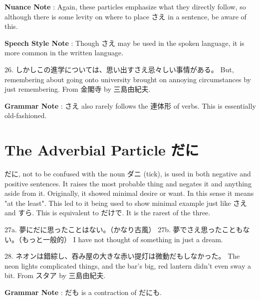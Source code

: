 \par{\textbf{Nuance Note }: Again, these particles emphasize what they directly follow, so although there is some levity on where to place さえ in a sentence, be aware of this. }

\par{\textbf{Speech Style Note }: Though さえ may be used in the spoken language, it is more common in the written language. }

\par{26. しかしこの進学については、思い出すさえ忌々しい事情がある。 \hfill\break
But, remembering about going onto university brought on annoying circumstances by just remembering. \hfill\break
From 金閣寺 by 三島由紀夫. }

\par{\textbf{Grammar Note }: さえ also rarely follows the 連体形 of verbs. This is essentially old-fashioned. }
      
\section{The Adverbial Particle だに}
 
\par{ だに, not to be confused with the noun ダニ (tick), is used in both negative and positive sentences. It raises the most probable thing and negates it and anything aside from it. Originally, it showed minimal desire or want. In this sense it means "at the least". This led to it being used to show minimal example just like さえ and すら. This is equivalent to だけで. It is the rarest of the three. }

\par{27a. 夢にだに思ったことはない。（かなり古風） \hfill\break
27b. 夢でさえ思ったこともない。（もっと一般的） \hfill\break
I have not thought of something in just a dream. }

\par{28. ネオンは錯綜し、吞み屋の大きな赤い提灯は微動だもしなかった。 \hfill\break
The neon lights complicated things, and the bar's big, red lantern didn't even sway a bit. \hfill\break
From スタア by 三島由紀夫. }

\par{\textbf{Grammar Note }: だも is a contraction of だにも. }
    